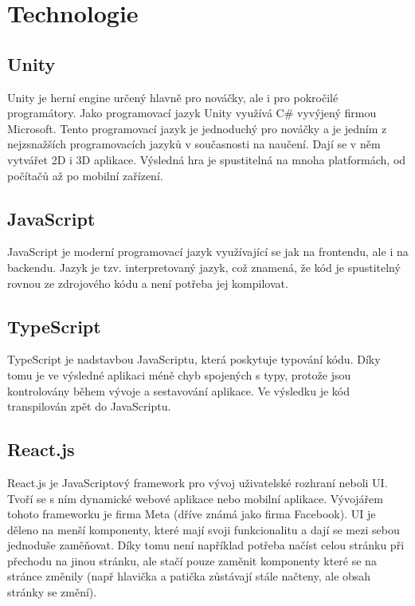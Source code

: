 \section{Technologie}

\subsection{Unity}
Unity je herní engine určený hlavně pro nováčky, ale i pro pokročilé programátory. Jako programovací jazyk Unity využívá C\# vyvýjený firmou Microsoft. Tento programovací jazyk je jednoduchý pro nováčky a je jedním z nejzsnažších programovacích jazyků v současnosti na naučení. \cite{Csharp} Dají se v něm vytvářet 2D i 3D aplikace. Výsledná hra je spustitelná na mnoha platformách, od počítačů až po mobilní zařízení.

\subsection{JavaScript}
JavaScript je moderní programovací jazyk využívající se jak na frontendu, ale i na backendu. Jazyk je tzv. interpretovaný jazyk, což znamená, že kód je spustitelný rovnou ze zdrojového kódu a není potřeba jej kompilovat.

\subsection{TypeScript}
TypeScript je nadstavbou JavaScriptu, která poskytuje typování kódu. Díky tomu je ve výsledné aplikaci méně chyb spojených s typy, protože jsou kontrolovány během vývoje a sestavování aplikace. Ve výsledku je kód transpilován zpět do JavaScriptu.

\subsection{React.js}
React.js je JavaScriptový framework pro vývoj uživatelské rozhraní neboli UI. Tvoří se s ním dynamické webové aplikace nebo mobilní aplikace. Vývojářem tohoto frameworku je firma Meta (dříve známá jako firma Facebook). UI je děleno na menší komponenty, které mají svoji funkcionalitu a dají se mezi sebou jednoduše zaměňovat. Díky tomu není například potřeba načíst celou stránku při přechodu na jinou stránku, ale stačí pouze zaměnit komponenty které se na stránce změnily (např hlavička a patička zůstávají stále načteny, ale obsah stránky se změní).

